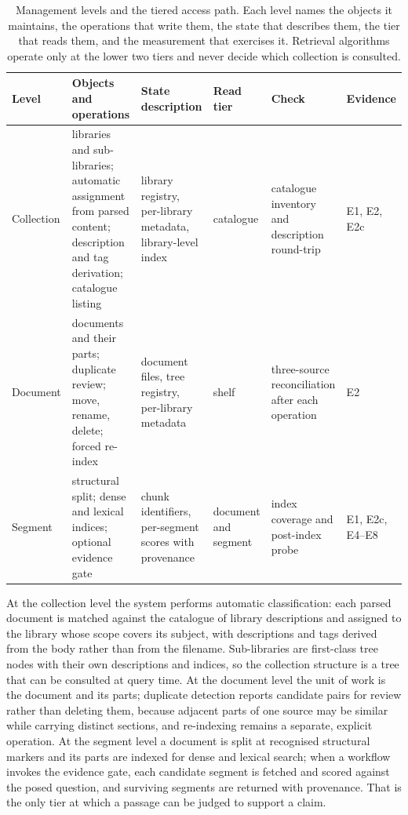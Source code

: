 \begin{table}[t]
\centering
\small
\setlength{\tabcolsep}{4pt}
\renewcommand{\arraystretch}{1.15}
\caption{Management levels and the tiered access path. Each level names the
objects it maintains, the operations that write them, the state that describes
them, the tier that reads them, and the measurement that exercises it.
Retrieval algorithms operate only at the lower two tiers and never decide
which collection is consulted.}
\label{tab:levels}
\begin{tabular}{@{}>{\raggedright\arraybackslash}p{}>{\raggedright\arraybackslash}p{}>{\raggedright\arraybackslash}p{}>{\raggedright\arraybackslash}p{}>{\raggedright\arraybackslash}p{}>{\raggedright\arraybackslash}p{}@{}}
\toprule
Level & Objects and operations & State description & Read tier & Check & Evidence\\
\midrule
Collection & libraries and sub-libraries; automatic assignment from parsed content; description and tag derivation; catalogue listing & library registry, per-library metadata, library-level index & catalogue & catalogue inventory and description round-trip & E1, E2, E2c\\
Document & documents and their parts; duplicate review; move, rename, delete; forced re-index & document files, tree registry, per-library metadata & shelf & three-source reconciliation after each operation & E2\\
Segment & structural split; dense and lexical indices; optional evidence gate & chunk identifiers, per-segment scores with provenance & document and segment & index coverage and post-index probe & E1, E2c, E4--E8\\
\bottomrule
\end{tabular}
\end{table}

At the collection level the system performs automatic classification: each
parsed document is matched against the catalogue of library descriptions and
assigned to the library whose scope covers its subject, with descriptions and
tags derived from the body rather than from the filename. Sub-libraries are
first-class tree nodes with their own descriptions and indices, so the
collection structure is a tree that can be consulted at query time. At the
document level the unit of work is the document and its parts; duplicate
detection reports candidate pairs for review rather than deleting them,
because adjacent parts of one source may be similar while carrying distinct
sections, and re-indexing remains a separate, explicit operation. At the
segment level a document is split at recognised structural markers and its
parts are indexed for dense and lexical search; when a workflow invokes the
evidence gate, each candidate segment is fetched and scored against the posed
question, and surviving segments are returned with provenance. That is the
only tier at which a passage can be judged to support a claim.

